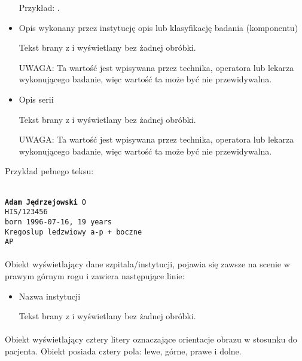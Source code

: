 \begin{itemize}
          Przykład: .

    \item Opis wykonany przez instytucję opis lub klasyfikację badania (komponentu)

          Tekst brany z  i wyświetlany bez żadnej obróbki.

          UWAGA: Ta wartość jest wpisywana przez technika, operatora lub lekarza wykonującego badanie, więc wartość ta może być nie przewidywalna.

    \item Opis serii

          Tekst brany z  i wyświetlany bez żadnej obróbki.

          UWAGA: Ta wartość jest wpisywana przez technika, operatora lub lekarza wykonującego badanie, więc wartość ta może być nie przewidywalna.
\end{itemize}

Przykład pełnego teksu:

\texttt{\\
    \textbf{Adam Jędrzejowski} O\\
    HIS/123456\\
    born 1996-07-16, 19 years\\
    Kregoslup ledzwiowy a-p + boczne\\
    AP
}

\paragraph{}

Obiekt wyświetlający dane szpitala/instytucji, pojawia się zawsze na scenie w prawym górnym rogu i zawiera następujące linie:
\begin{itemize}
    \item Nazwa instytucji

          Tekst brany z  i wyświetlany bez żadnej obróbki.

\end{itemize}

\paragraph{}

\par
Obiekt wyświetlający cztery litery oznaczające orientacje obrazu w stosunku do pacjenta.
Obiekt posiada cztery pola: lewe, górne, prawe i dolne.

